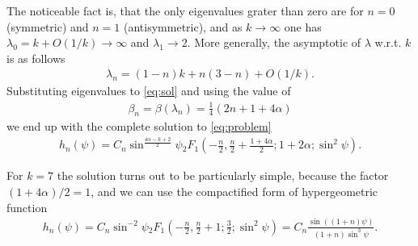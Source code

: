 The noticeable fact is, that the only eigenvalues grater than zero are
for $n=0$ (symmetric) and $n=1$ (antisymmetric), and as
$k\rightarrow\infty$ one has $\lambda_0= k + O(1/k)\rightarrow\infty$
and $\lambda_1\rightarrow 2$. More generally, the asymptotic of
$\lambda$ w.r.t. $k$ is as follows
\begin{gather}
  \lambda_n=(1-n)k+n(3-n)+O(1/k).
\end{gather}
Substituting eigenvalues to \eqref{eq:sol} and using the value of
\begin{gather}
  \beta_n=\beta(\lambda_n)=\frac{1}{4}(2n+1+4\alpha)
\end{gather}
we end up with the complete solution to \eqref{eq:problem}
\begin{gather}
  h_n(\psi)=C_n\sin^{\frac{4\alpha-k+2}{2}}\psi {}_2 F_1 (-\frac{n}{2},\frac{n}{2}+\frac{1+4\alpha}{2};1+2\alpha;\sin^2\psi).
\end{gather}


For $k=7$ the solution turns out to be particularly simple, because the
factor $(1+4\alpha)/2=1$, and we can use the compactified form of
hypergeometric function
\begin{gather}
  h_n(\psi)=C_n\sin^{-2}\psi
  {}_2F_1(-\frac{n}{2},\frac{n}{2}+1;\frac{3}{2};\sin^2\psi)
  =C_n\frac{\sin((1+n)\psi)}{(1+n)\sin^3\psi}.
\end{gather}

